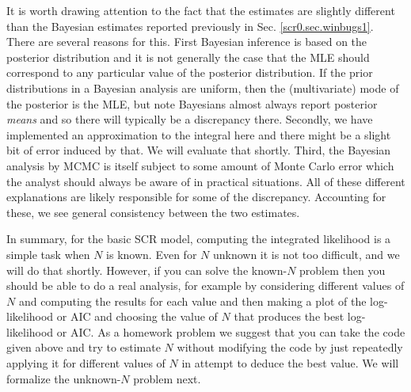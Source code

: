 It is worth drawing attention to the fact that the estimates are slightly
different than the Bayesian estimates reported previously in
Sec. \ref{scr0.sec.winbugs1}.   There are several reasons
for this.  First Bayesian inference is based on the posterior
distribution and it is not generally the case that the MLE should
correspond to any particular value of the posterior distribution. If
the prior distributions in a Bayesian analysis are uniform, then the
(multivariate) mode of the posterior is the MLE, but note 
Bayesians almost always report posterior {\it means} and so there will
typically be a discrepancy there. Secondly, we have implemented an
approximation to the integral here and there might be a slight bit of
error induced by that. We will evaluate that shortly. Third, the
Bayesian analysis by MCMC is itself subject to some amount of Monte Carlo
error which the analyst should always be aware of in practical
situations.  All of these different explanations are likely
responsible for some of the discrepancy. Accounting for these, we see
general consistency between the two estimates.

\begin{comment} 
To compute the integrated likelihood we used a discrete representation
of the state-space so that the integral could be approximated as a
summation over possible values of ${\bf s}$ with each value being
weighted by its probability of occurring, which is $1/nG$ under the
assumption that ${\bf s}$ is uniform on the state-space ${\cal
  S}$. Recall
in Chapt. \ref{chapt.scr0} we 
used a discrete state-space in developing a Bayesian analysis of the
model in order to be able to modify the state-space in a flexible
manner. In that case, we could use the discretized state-space as the
integration grid and just feed it into our integrated likelihood
routine. 
\end{comment}

In summary, for the basic SCR model, computing the integrated
likelihood is a simple task when $N$ is known. Even for $N$
unknown it is not too difficult, and we will do that shortly.
However, if you can solve the known-$N$ problem then you should be able
to do a real analysis, for example by considering different values of
$N$ and computing the results for each value and then making a plot of
the log-likelihood or AIC and choosing the value of $N$ that produces
the best log-likelihood or AIC. As a homework problem we suggest that
you can take the code given above and try to estimate $N$ without
modifying the code by just repeatedly applying it for 
different values of $N$ in attempt to deduce the best value.
We will formalize the unknown-$N$ problem next.

